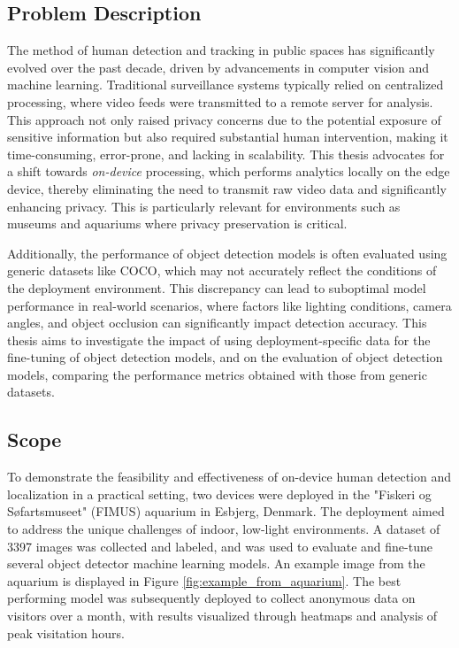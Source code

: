 \subsection{Problem Description}
The method of human detection and tracking in public spaces has significantly evolved over the past decade, driven by advancements in computer vision and machine learning. Traditional surveillance systems typically relied on centralized processing, where video feeds were transmitted to a remote server for analysis. This approach not only raised privacy concerns due to the potential exposure of sensitive information but also required substantial human intervention, making it time-consuming, error-prone, and lacking in scalability. This thesis advocates for a shift towards \textit{on-device} processing, which performs analytics locally on the edge device, thereby eliminating the need to transmit raw video data and significantly enhancing privacy. This is particularly relevant for environments such as museums and aquariums where privacy preservation is critical.

Additionally, the performance of object detection models is often evaluated using generic datasets like COCO, which may not accurately reflect the conditions of the deployment environment. This discrepancy can lead to suboptimal model performance in real-world scenarios, where factors like lighting conditions, camera angles, and object occlusion can significantly impact detection accuracy. This thesis aims to investigate the impact of using deployment-specific data for the fine-tuning of object detection models, and on the evaluation of object detection models, comparing the performance metrics obtained with those from generic datasets.

\subsection{Scope}
To demonstrate the feasibility and effectiveness of on-device human detection and localization in a practical setting, two devices were deployed in the "Fiskeri og Søfartsmuseet" (FIMUS) aquarium in Esbjerg, Denmark. The deployment aimed to address the unique challenges of indoor, low-light environments. A dataset of 3397 images was collected and labeled, and was used to evaluate and fine-tune several object detector machine learning models. An example image from the aquarium is displayed in Figure \ref{fig:example_from_aquarium}. The best performing model was subsequently deployed to collect anonymous data on visitors over a month, with results visualized through heatmaps and analysis of peak visitation hours. 

